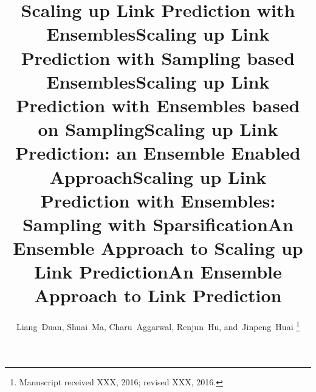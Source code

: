\documentclass[10pt,journal,compsoc]{IEEEtran}
\begin{document}
%
\title{Scaling up Link Prediction with Ensembles}
\title{Scaling up Link Prediction with Sampling based Ensembles}
\title{Scaling up Link Prediction with Ensembles based on Sampling}
\title{Scaling up Link Prediction: an Ensemble Enabled Approach}
\title{Scaling up Link Prediction with Ensembles: Sampling with Sparsification}
\title{An Ensemble Approach to Scaling up Link Prediction}
\title{An Ensemble Approach to Link Prediction}
%
%
%
%

\author{Liang~Duan,
        Shuai~Ma,
        Charu~Aggarwal,
        Renjun~Hu,
        and~Jinpeng~Huai
\thanks{Manuscript received XXX, 2016; revised XXX, 2016.}}
\end{document}
